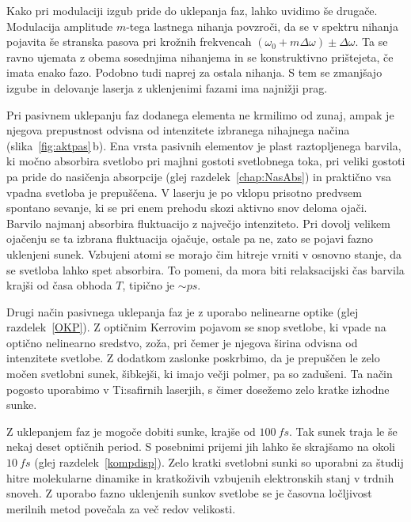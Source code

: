 Kako pri modulaciji izgub pride do uklepanja faz, lahko uvidimo še drugače.
Modulacija amplitude $m$-tega lastnega nihanja povzroči, da se v spektru nihanja
pojavita še stranska pasova pri krožnih frekvencah $(\omega_0 + m\Delta \omega) \pm \Delta\omega$. Ta
se ravno ujemata z obema sosednjima nihanjema in se konstruktivno
prištejeta, če imata enako fazo. Podobno tudi naprej za ostala nihanja. 
S tem se zmanjšajo izgube in delovanje laserja z uklenjenimi fazami ima najnižji prag. 

Pri pasivnem uklepanju faz dodanega elementa ne krmilimo od zunaj, 
ampak je njegova prepustnost odvisna od intenzitete
izbranega nihajnega načina (slika~\ref{fig:aktpas}\,b). 
Ena vrsta pasivnih elementov je plast raztopljenega
barvila, ki močno absorbira svetlobo pri majhni gostoti svetlobnega toka, pri veliki 
gostoti pa pride do nasičenja absorpcije (glej
razdelek~\ref{chap:NasAbs}) in praktično vsa vpadna svetloba je prepuščena. 
V laserju je po vklopu prisotno predvsem 
spontano sevanje, ki se pri enem prehodu skozi aktivno snov deloma ojači. 
Barvilo najmanj absorbira fluktuacijo z največjo intenziteto. Pri dovolj 
velikem ojačenju se ta izbrana fluktuacija ojačuje, ostale pa ne, zato
se pojavi fazno uklenjeni sunek. Vzbujeni atomi se morajo čim hitreje
vrniti v osnovno stanje, da se svetloba lahko spet absorbira. To pomeni, da
 mora biti relaksacijski čas barvila  krajši od časa
obhoda $T$, tipično je $\sim \si{ps}$. 

Drugi način pasivnega uklepanja faz je z uporabo nelinearne optike 
(glej 
razdelek~\ref{OKP}). Z optičnim Kerrovim pojavom se snop svetlobe, ki vpade na 
optično nelinearno sredstvo, zoža, pri čemer je njegova širina odvisna od 
intenzitete svetlobe. Z dodatkom zaslonke poskrbimo, 
da je prepuščen le zelo močen svetlobni sunek, šibkejši, ki imajo večji polmer,
pa so zadušeni. Ta način pogosto
uporabimo v Ti:safirnih laserjih, s čimer dosežemo zelo
kratke izhodne sunke.

Z uklepanjem faz je mogoče dobiti sunke, krajše od $100~\si{fs}$. 
Tak sunek traja le še nekaj deset optičnih period. S posebnimi prijemi 
jih lahko še skrajšamo na okoli $10~\si{fs}$ (glej razdelek~\ref{kompdisp}). 
Zelo kratki svetlobni sunki so uporabni za študij hitre molekularne dinamike 
in kratkoživih vzbujenih elektronskih stanj v trdnih snoveh. Z uporabo fazno
uklenjenih sunkov svetlobe se je časovna ločljivost merilnih metod povečala za 
več redov velikosti.

